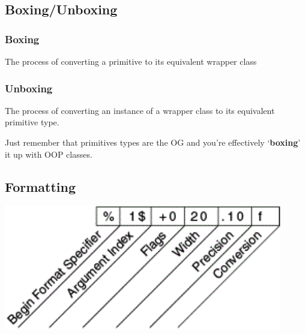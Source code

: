 \documentclass[]{article}
\newenvironment{Shaded}{}{}
\newcommand{\BuiltInTok}[1]{#1}
\newcommand{\CommentTok}[1]{\textcolor[rgb]{0.38,0.63,0.69}{\textit{#1}}}
\newcommand{\DecValTok}[1]{\textcolor[rgb]{0.25,0.63,0.44}{#1}}
\newcommand{\FunctionTok}[1]{\textcolor[rgb]{0.02,0.16,0.49}{#1}}
\newcommand{\NormalTok}[1]{#1}
\newcommand{\SpecialCharTok}[1]{\textcolor[rgb]{0.25,0.44,0.63}{#1}}
\newcommand{\StringTok}[1]{\textcolor[rgb]{0.25,0.44,0.63}{#1}}
\begin{document}
\hypertarget{boxingunboxing}{%
\subsection{Boxing/Unboxing}\label{boxingunboxing}}

\hypertarget{boxing}{%
\subsubsection{Boxing}\label{boxing}}

The process of converting a primitive to its equivalent wrapper class

\hypertarget{unboxing}{%
\subsubsection{Unboxing}\label{unboxing}}

The process of converting an instance of a wrapper class to its
equivalent primitive type.

Just remember that primitives types are the OG and you're effectively
`\textbf{boxing}' it up with OOP classes.

\hypertarget{formatting}{%
\subsection{Formatting}\label{formatting}}

\begin{Shaded}
\end{Shaded}

\includegraphics{images/formatting.png}
\end{document}
